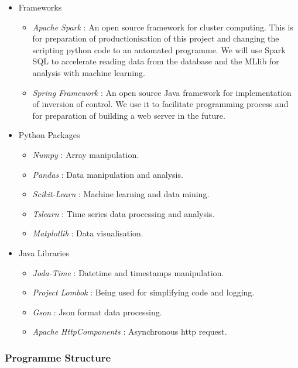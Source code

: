\documentclass[11pt]{article} %
\theoremstyle{plain}
\theoremstyle{definition}
\begin{document}
\begin{itemize}
  \item Frameworks
  \begin{itemize}
    \item \textsl{Apache Spark}\cite{spark} : An open source framework for cluster computing. This is for preparation of productionisation of this project and changing the scripting python code to an automated programme. We will use Spark SQL to accelerate reading data from the database and the MLlib for analysis with machine learning.
    \item \textsl{Spring Framework}\cite{spring} : An open source Java framework for implementation of inversion of control. We use it to facilitate programming process and for preparation of building a web server in the future.
  \end{itemize}

  \item Python Packages
  \begin{itemize}
    \item \textsl{Numpy}\cite{scipy} : Array manipulation.
    \item \textsl{Pandas}\cite{scipy} : Data manipulation and analysis.
    \item \textsl{Scikit-Learn}\cite{scipy} : Machine learning and data mining.
    \item \textsl{Tslearn}\cite{tslearn} : Time series data processing and analysis.
    \item \textsl{Matplotlib}\cite{scipy} : Data visualisation.
  \end{itemize}

  \item Java Libraries
  \begin{itemize}
    \item \textsl{Joda-Time}\cite{jodatime} : Datetime and timestamps manipulation.
    \item \textsl{Project Lombok}\cite{lombok} : Being used for simplifying code and logging.
    \item \textsl{Gson}\cite{gson} : Json format data processing.
    \item \textsl{Apache HttpComponents}\cite{httpcomponents} : Asynchronous http request.
  \end{itemize}

\end{itemize}

\subsubsection{Programme Structure}
\end{document}
